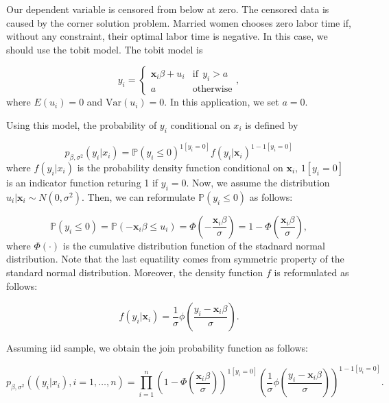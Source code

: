 \documentclass[
  12pt,
]{article}
\begin{document}
Our dependent variable is censored from below at zero.
The censored data is caused by the corner solution problem.
Married women chooses zero labor time
if, without any constraint, their optimal labor time is negative.
In this case, we should use the tobit model.
The tobit model is

\begin{equation*}
  y_i = 
  \begin{cases}
    \mathbf{x}_i \beta + u_i &\mathrm{if}\:\: y_i > a  \\
    a                        &\mathrm{otherwise}
  \end{cases},
\end{equation*}
where \(E(u_i) = 0\) and \(\mathrm{Var}(u_i) = 0\).
In this application, we set \(a = 0\).

Using this model, the probability of \(y_i\) conditional on \(x_i\) is defined by

\begin{equation*}
  p_{\beta, \sigma^2}(y_i | x_i) = \mathbb{P}(y_i \le 0)^{1[y_i = 0]} f(y_i | \mathbf{x}_i)^{1 - 1[y_i = 0]}
\end{equation*}
where \(f(y_i|x_i)\) is the probability density function conditional on \(\mathbf{x}_i\),
\(1[y_i = 0]\) is an indicator function returing 1 if \(y_i = 0\).
Now, we assume the distribution \(u_i | \mathbf{x}_i \sim N(0, \sigma^2)\).
Then, we can reformulate \(\mathbb{P}(y_i \le 0)\) as follows:

\begin{equation*}
  \mathbb{P}(y_i \le 0) 
  = \mathbb{P}(-\mathbf{x}_i \beta \le u_i) 
  = \Phi \left( -\frac{\mathbf{x}_i \beta}{\sigma} \right)  
  = 1 - \Phi \left( \frac{\mathbf{x}_i \beta}{\sigma} \right),
\end{equation*}
where \(\Phi(\cdot)\) is the cumulative distribution function of the stadnard normal distribution.
Note that the last equatility comes from symmetric property of the standard normal distribution.
Moreover, the density function \(f\) is reformulated as follows:

\begin{equation*}
  f(y_i | \mathbf{x}_i) = \frac{1}{\sigma} \phi \left( \frac{y_i - \mathbf{x}_i \beta}{\sigma} \right).
\end{equation*}

Assuming iid sample, we obtain the join probability function as follows:

\begin{equation*}
  p_{\beta, \sigma^2}((y_i | x_i), i = 1, \ldots, n) 
  = \prod_{i=1}^n \left(1 - \Phi \left( \frac{\mathbf{x}_i \beta}{\sigma} \right) \right)^{1[y_i = 0]} 
  \left( \frac{1}{\sigma} \phi \left( \frac{y_i - \mathbf{x}_i \beta}{\sigma} \right) \right)^{1 - 1[y_i = 0]}.
\end{equation*}
\end{document}
